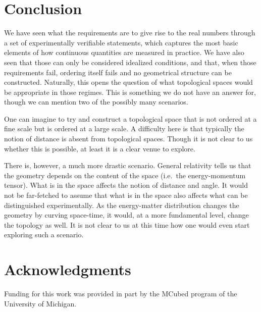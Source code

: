 \documentclass[12pt]{iopart}
\begin{document}
\section{Conclusion}

We have seen what the requirements are to give rise to the real numbers through a set of experimentally verifiable statements, which captures the most basic elements of how continuous quantities are measured in practice. We have also seen that those can only be considered idealized conditions, and that, when those requirements fail, ordering itself fails and no geometrical structure can be constructed. Naturally, this opens the question of what topological spaces would be appropriate in those regimes. This is something we do not have an answer for, though we can mention two of the possibly many scenarios.

One can imagine to try and construct a topological space that is not ordered at a fine scale but is ordered at a large scale. A difficulty here is that typically the notion of distance is absent from topological spaces. Though it is not clear to us whether this is possible, at least it is a clear venue to explore.

There is, however, a much more drastic scenario. General relativity tells us that the geometry depends on the content of the space (i.e.~the energy-momentum tensor). What is in the space affects the notion of distance and angle. It would not be far-fetched to assume that what is in the space also affects what can be distinguished experimentally. As the energy-matter distribution changes the geometry by curving space-time, it would, at a more fundamental level, change the topology as well. It is not clear to us at this time how one would even start exploring such a scenario.


\section*{Acknowledgments}

Funding for this work was provided in part by the MCubed program of the University of Michigan.
\end{document}
